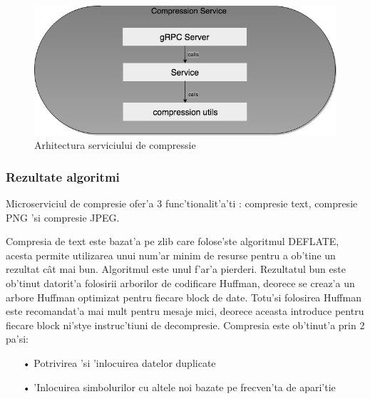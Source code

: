 \documentclass[12pt,a4paper,twoside]{report}
\begin{document}
\begin{figure}[H]
\begin{center}
\advance\leftskip-3cm
\advance\rightskip-3cm
\includegraphics[keepaspectratio=true,scale=0.4]{img/compression_arch.png}
\caption{Arhitectura serviciului de compressie}
\label{compress_arch}
\end{center}
\end{figure}

\subsubsection{Rezultate algoritmi}
Microserviciul de compresie ofer'a 3 func'tionalit'a'ti : compresie text, compresie PNG 'si compresie JPEG.

Compresia de text este bazat'a pe zlib care folose'ste algoritmul DEFLATE, acesta permite utilizarea unui num'ar minim de resurse pentru a ob'tine un rezultat cât mai bun. Algoritmul este unul f'ar'a pierderi.
Rezultatul bun este ob'tinut datorit'a folosirii arborilor de codificare Huffman, deorece se creaz'a un arbore Huffman optimizat pentru fiecare block de date. Totu'si folosirea Huffman este recomandat'a mai mult pentru mesaje mici, deorece aceasta introduce pentru fiecare block ni'stye instruc'tiuni de decompresie.
Compresia este ob'tinut'a prin 2 pa'si:
\begin{enumerate}
\item[•]Potrivirea 'si 'inlocuirea datelor duplicate
\item[•] 'Inlocuirea simbolurilor cu altele noi bazate pe frecven'ta de apari'tie
\end{enumerate}
\end{document}

